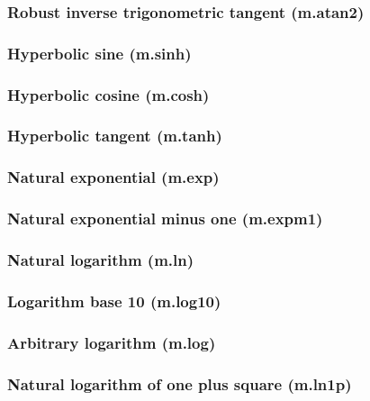 \documentclass{article}
\theoremstyle{definition}
\begin{document}
\subsubsection{Robust inverse trigonometric tangent (m.atan2)}

\subsubsection{Hyperbolic sine (m.sinh)}

\subsubsection{Hyperbolic cosine (m.cosh)}

\subsubsection{Hyperbolic tangent (m.tanh)}

\subsubsection{Natural exponential (m.exp)}

\subsubsection{Natural exponential minus one (m.expm1)}

\subsubsection{Natural logarithm (m.ln)}

\subsubsection{Logarithm base 10 (m.log10)}

\subsubsection{Arbitrary logarithm (m.log)}

\subsubsection{Natural logarithm of one plus square (m.ln1p)}
\end{document}
